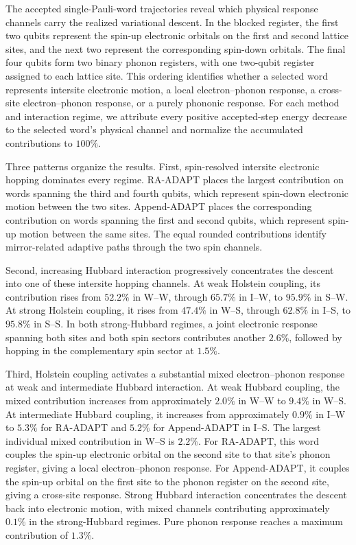 \documentclass[
  reprint,
  amsmath,
  amssymb,
  aps,
  pra,
  nofootinbib,
  superscriptaddress,
  floatfix
]{revtex4-2}
\begin{document}
The accepted single-Pauli-word trajectories reveal which physical response
channels carry the realized variational descent.  In the blocked register, the
first two qubits represent the spin-up electronic orbitals on the first and
second lattice sites, and the next two represent the corresponding spin-down
orbitals.  The final four qubits form two binary phonon registers, with one
two-qubit register assigned to each lattice site.  This ordering identifies
whether a selected word represents intersite electronic motion, a local
electron--phonon response, a cross-site electron--phonon response, or a purely
phononic response.  For each method and interaction regime, we attribute every
positive accepted-step energy decrease to the selected word's physical channel
and normalize the accumulated contributions to \(100\%\).

Three patterns organize the results.  First, spin-resolved intersite electronic
hopping dominates every regime.  RA-ADAPT places the largest contribution on
words spanning the third and fourth qubits, which represent spin-down
electronic motion between the two sites.  Append-ADAPT places the corresponding
contribution on words spanning the first and second qubits, which represent
spin-up motion between the same sites.  The equal rounded contributions
identify mirror-related adaptive paths through the two spin channels.

Second, increasing Hubbard interaction progressively concentrates the descent
into one of these intersite hopping channels.  At weak Holstein coupling, its
contribution rises from \(52.2\%\) in W--W, through \(65.7\%\) in I--W, to
\(95.9\%\) in S--W.  At strong Holstein coupling, it rises from \(47.4\%\)
in W--S, through \(62.8\%\) in I--S, to \(95.8\%\) in S--S.  In both
strong-Hubbard regimes, a joint electronic response spanning both sites and
both spin sectors contributes another \(2.6\%\), followed by hopping in the
complementary spin sector at \(1.5\%\).

Third, Holstein coupling activates a substantial mixed electron--phonon
response at weak and intermediate Hubbard interaction.  At weak Hubbard
coupling, the mixed contribution increases from approximately \(2.0\%\) in
W--W to \(9.4\%\) in W--S.  At intermediate Hubbard coupling, it increases
from approximately \(0.9\%\) in I--W to \(5.3\%\) for RA-ADAPT and
\(5.2\%\) for Append-ADAPT in I--S.  The largest individual mixed
contribution in W--S is \(2.2\%\).  For RA-ADAPT, this word couples the
spin-up electronic orbital on the second site to that site's phonon register,
giving a local electron--phonon response.  For Append-ADAPT, it couples the
spin-up orbital on the first site to the phonon register on the second site,
giving a cross-site response.  Strong Hubbard interaction concentrates the
descent back into electronic motion, with mixed channels contributing
approximately \(0.1\%\) in the strong-Hubbard regimes.  Pure phonon response
reaches a maximum contribution of \(1.3\%\).
\par\addvspace{1.0ex}
\end{document}
